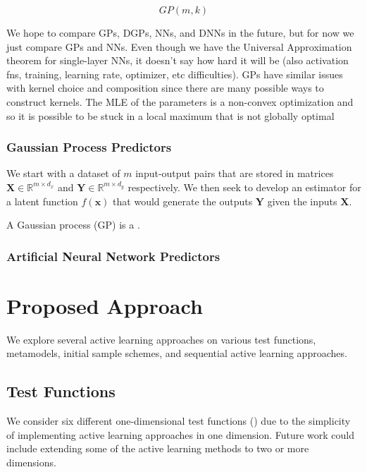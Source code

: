 \documentclass[conference]{IEEEtran}
\begin{document}
	\begin{equation*}
	GP(m, k)
	\end{equation*}
	
	We hope to compare GPs, DGPs, NNs, and DNNs in the future, but for now we just compare GPs and NNs. Even though we have the Universal Approximation theorem for single-layer NNs, it doesn't say how hard it will be (also activation fns, training, learning rate, optimizer, etc difficulties). GPs have similar issues with kernel choice and composition since there are many possible ways to construct kernels. The MLE of the parameters is a non-convex optimization and so it is possible to be stuck in a local maximum that is not globally optimal
	
	\subsubsection{Gaussian Process Predictors}
	
	We start with a dataset of $m$ input-output pairs that are stored in matrices $\mathbf{X} \in \mathbb{R}^{m \times d_x}$ and $\mathbf{Y} \in \mathbb{R}^{m \times d_y}$ respectively. We then seek to develop an estimator for a latent function $f(\mathbf{x})$ that would generate the outputs $\mathbf{Y}$ given the inputs $\mathbf{X}$.
	
	A Gaussian process (GP) is a \cite{williams2006gaussian}.
	
	\subsubsection{Artificial Neural Network Predictors}
	
	\section{Proposed Approach}
	\label{sec:proposed-approach}
	
	We explore several active learning approaches on various test functions, metamodels, initial sample schemes, and sequential active learning approaches.
	
	\subsection{Test Functions}
	
	We consider six different one-dimensional test functions () due to the simplicity of implementing active learning approaches in one dimension. Future work could include extending some of the active learning methods to two or more dimensions.
	
\end{document}
